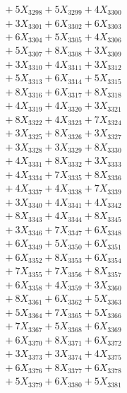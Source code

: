 \documentclass[a4paper,10pt]{article}
\begin{document}
{\begin{align}
&\;  + 5 X_{3298} + 5 X_{3299} + 4 X_{3300} \\[0.3ex]
&\;  + 3 X_{3301} + 6 X_{3302} + 6 X_{3303} \\[0.3ex]
&\;  + 6 X_{3304} + 5 X_{3305} + 4 X_{3306} \\[0.3ex]
&\;  + 5 X_{3307} + 8 X_{3308} + 3 X_{3309} \\[0.5ex]\allowbreak
&\;  + 3 X_{3310} + 4 X_{3311} + 3 X_{3312} \\[0.3ex]
&\;  + 5 X_{3313} + 6 X_{3314} + 5 X_{3315} \\[0.3ex]
&\;  + 8 X_{3316} + 6 X_{3317} + 8 X_{3318} \\[0.3ex]
&\;  + 4 X_{3319} + 4 X_{3320} + 3 X_{3321} \\[0.3ex]
&\;  + 8 X_{3322} + 4 X_{3323} + 7 X_{3324} \\[0.3ex]
&\;  + 3 X_{3325} + 8 X_{3326} + 3 X_{3327} \\[0.3ex]
&\;  + 3 X_{3328} + 3 X_{3329} + 8 X_{3330} \\[0.3ex]
&\;  + 4 X_{3331} + 8 X_{3332} + 3 X_{3333} \\[0.3ex]
&\;  + 4 X_{3334} + 7 X_{3335} + 8 X_{3336} \\[0.3ex]
&\;  + 4 X_{3337} + 4 X_{3338} + 7 X_{3339} \\[0.5ex]\allowbreak
&\;  + 3 X_{3340} + 4 X_{3341} + 4 X_{3342} \\[0.3ex]
&\;  + 8 X_{3343} + 4 X_{3344} + 8 X_{3345} \\[0.3ex]
&\;  + 3 X_{3346} + 7 X_{3347} + 6 X_{3348} \\[0.3ex]
&\;  + 6 X_{3349} + 5 X_{3350} + 6 X_{3351} \\[0.3ex]
&\;  + 6 X_{3352} + 8 X_{3353} + 6 X_{3354} \\[0.3ex]
&\;  + 7 X_{3355} + 7 X_{3356} + 8 X_{3357} \\[0.3ex]
&\;  + 6 X_{3358} + 4 X_{3359} + 3 X_{3360} \\[0.3ex]
&\;  + 8 X_{3361} + 6 X_{3362} + 5 X_{3363} \\[0.3ex]
&\;  + 5 X_{3364} + 7 X_{3365} + 5 X_{3366} \\[0.3ex]
&\;  + 7 X_{3367} + 5 X_{3368} + 6 X_{3369} \\[0.5ex]\allowbreak
&\;  + 6 X_{3370} + 8 X_{3371} + 6 X_{3372} \\[0.3ex]
&\;  + 3 X_{3373} + 3 X_{3374} + 4 X_{3375} \\[0.3ex]
&\;  + 6 X_{3376} + 8 X_{3377} + 6 X_{3378} \\[0.3ex]
&\;  + 5 X_{3379} + 6 X_{3380} + 5 X_{3381} \\[0.3ex]

\end{align}}
\end{document}
